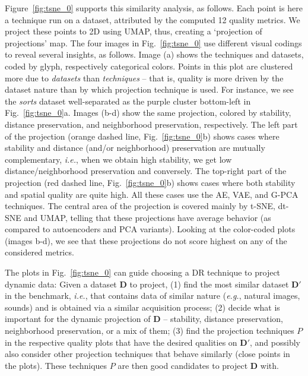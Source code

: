 Figure~\ref{fig:tsne_0} supports this similarity analysis, as follows. Each point is here a technique run on a dataset, attributed by the computed 12 quality metrics. We project these points to 2D using UMAP, thus, creating a `projection of projections' map. The four images in Fig.~\ref{fig:tsne_0} use different visual codings to reveal several insights, as follows. Image (a) shows the techniques and datasets, coded by glyph, respectively categorical colors. Points in this plot are clustered more due to \emph{datasets} than \emph{techniques} -- that is, quality is more driven by the dataset nature than by which projection technique is used. For instance, we see the \emph{sorts} dataset well-separated as the purple cluster bottom-left in Fig.~\ref{fig:tsne_0}a. Images (b-d) show the same projection, colored by stability, distance preservation, and neighborhood preservation, respectively. The left part of the projection (orange dashed line, Fig.~\ref{fig:tsne_0}b) shows cases where stability and distance (and/or neighborhood) preservation are mutually complementary, \emph{i.e.}, when we obtain high stability, we get low distance/neighborhood preservation and conversely. The top-right part of the projection  (red dashed line, Fig.~\ref{fig:tsne_0}b) shows cases where both stability and spatial quality are quite high. All these cases use the AE, VAE, and G-PCA techniques. The central area of the projection is covered mainly by t-SNE, dt-SNE and UMAP, telling that these projections have average behavior (as compared to autoencoders and PCA variants). Looking at the color-coded plots (images b-d), we see that these projections do not score highest on any of the considered metrics.




The plots in Fig.~\ref{fig:tsne_0} can guide choosing a DR technique to project dynamic data: Given a dataset $\mathbf{D}$ to project, (1) find the most similar dataset $\mathbf{D}'$ in the benchmark, \emph{i.e.}, that contains data of similar nature (\emph{e.g.}, natural images, sounds) and is obtained via a similar acquisition process; (2) decide what is important for the dynamic projection of $\mathbf{D}$ -- stability, distance preservation, neighborhood preservation, or a mix of them; (3) find the projection techniques $P$ in the respective quality plots that have the desired qualities on $\mathbf{D}'$, and possibly also consider other projection techniques that behave similarly (close points in the plots). These techniques $P$ are then good candidates to project $\mathbf{D}$ with.

